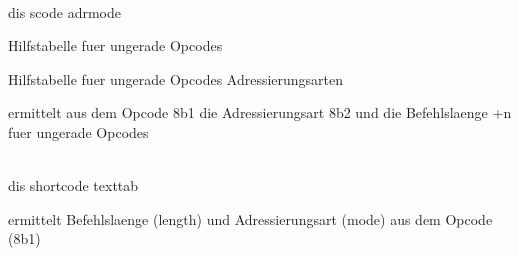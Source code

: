                                          
                                         
                                         
                                         
                                         
                                         
                                         
                                         
                                         
                                         
                                         
                                         
                                         
                                         
                                        
\\ dis scode adrmode                     
                                         
Hilfstabelle fuer ungerade Opcodes       
                                         
                                         
                                         
Hilfstabelle fuer ungerade Opcodes       
 Adressierungsarten                      
                                         
                                         
ermittelt aus dem Opcode 8b1             
die Adressierungsart 8b2                 
und die Befehlslaenge +n                 
fuer ungerade Opcodes                    
                                         
                                         
                                         
                                         
                                         
                                         
                                         
                                         
                                         
                                         
                                        
\\ dis shortcode texttab                 
                                         
ermittelt Befehlslaenge (length)         
und Adressierungsart (mode)              
aus dem Opcode (8b1)                     
                                         
